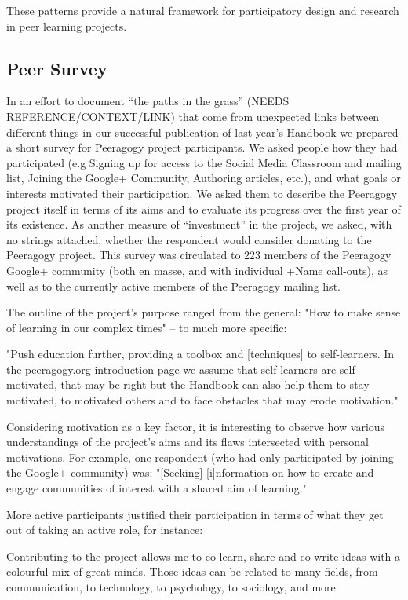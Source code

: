 \documentclass{acm_proc_article-sp}
\begin{document}
These patterns provide a natural framework for participatory design and research in peer learning projects.

\subsection{Peer Survey}

In an effort to document ``the paths in the grass'' (NEEDS REFERENCE/CONTEXT/LINK) that come from unexpected links between different things in our successful publication of last year's Handbook we prepared a short survey for Peeragogy project participants. We asked people how they had participated (e.g Signing up for access to the Social Media Classroom and mailing list, Joining the Google+ Community, Authoring articles, etc.), and what goals or interests motivated their participation. We asked them to describe the Peeragogy project itself in terms of its aims and to evaluate its progress over the first year of its existence. As another measure of ``investment'' in the project, we asked, with no strings attached, whether the respondent would consider donating to the Peeragogy project. This survey was circulated to 223 members of the Peeragogy Google+ community (both en masse, and with individual +Name call-outs), as well as to the currently active members of the Peeragogy mailing list.

The outline of the project's purpose ranged from the general: "How to make sense of learning in our complex times" -- to much more specific:

"Push education further, providing a toolbox and [techniques] to self-learners. In the peeragogy.org introduction page we assume that self-learners are self-motivated, that may be right but the Handbook can also help them to stay motivated, to motivated others and to face obstacles that may erode motivation."

Considering motivation as a key factor, it is interesting to observe how various understandings of the project's aims and its flaws intersected with personal motivations. For example, one respondent (who had only participated by joining the Google+ community) was: "[Seeking] [i]nformation on how to create and engage communities of interest with a shared aim of learning."

More active participants justified their participation in terms of what they get out of taking an active role, for instance:

Contributing to the project allows me to co-learn, share and co-write ideas with a colourful mix of great minds. Those ideas can be related to many fields, from communication, to technology, to psychology, to sociology, and more.
\end{document}
